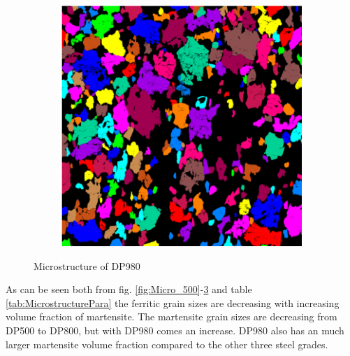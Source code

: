 \documentclass{article}
\begin{document}
\begin{figure}[h!]
\begin{subfigure}[b]{0.3\textwidth}
         \caption{}
         \label{fig:Micro2_980}
     \end{subfigure}
          \hfill
     \begin{subfigure}[b]{0.3\textwidth}
         \centering
         \includegraphics[width=\textwidth]{Micro3_980.png}
         \caption{}
         \label{fig:Micro3_980}
     \end{subfigure}
     \caption{Microstructure of DP980}
     \label{fig:Micro_980}
\end{figure}

As can be seen both from fig. \ref{fig:Micro_500}-\ref{fig:Micro_980} and table \ref{tab:MicrostructurePara} the ferritic grain sizes are decreasing with increasing volume fraction of martensite. The martensite grain sizes are decreasing from DP500 to DP800, but with DP980 comes an increase. DP980 also has an much larger martensite volume fraction compared to the other three steel grades. 
\end{document}
